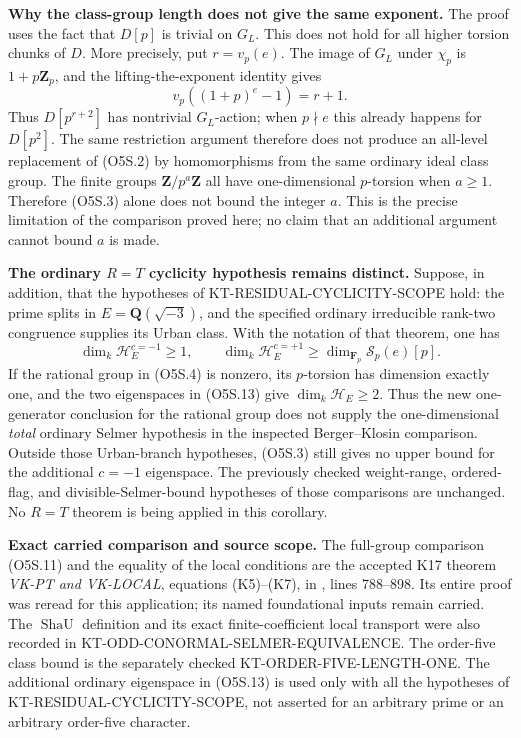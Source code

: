 \documentclass[11pt,a4paper]{article}
\theoremstyle{definition}
\renewcommand{\paragraph}[1]{\par\smallskip\noindent\textbf{#1}\quad\ignorespaces}
\begin{document}
\paragraph{Why the class-group length does not give the same exponent.}
The proof uses the fact that $D[p]$ is trivial on $G_L$.
This does not hold for all higher torsion chunks of $D$.
More precisely, put $r=v_p(e)$.  The image of $G_L$ under
$\chi_p$ is $1+p\mathbf Z_p$, and the lifting-the-exponent
identity gives
\[
                  v_p((1+p)^e-1)=r+1.
 \tag{O5S.12}
\]
Thus $D[p^{r+2}]$ has nontrivial $G_L$-action; when $p\nmid e$
this already happens for $D[p^2]$.
The same restriction argument therefore does not produce an
all-level replacement of (O5S.2) by homomorphisms from the same
ordinary ideal class group.
The finite groups $\mathbf Z/p^a\mathbf Z$ all have
one-dimensional $p$-torsion when $a\ge1$.
Therefore (O5S.3) alone does not bound the integer $a$.
This is the precise limitation of the comparison proved here;
no claim that an additional argument cannot bound $a$ is made.

\paragraph{The ordinary $R=T$ cyclicity hypothesis remains distinct.}
Suppose, in addition, that the hypotheses of
KT-RESIDUAL-CYCLICITY-SCOPE hold: the prime splits in
$E=\mathbf Q(\sqrt{-3})$, and the specified ordinary
irreducible rank-two congruence supplies its Urban class.
With the notation of that theorem, one has
\[
 \dim_k\mathcal H_E^{c=-1}\ge1,
 \qquad
 \dim_k\mathcal H_E^{c=+1}
        \ge\dim_{\mathbf F_p}\mathcal S_p(e)[p].
 \tag{O5S.13}
\]
If the rational group in (O5S.4) is nonzero, its $p$-torsion
has dimension exactly one, and the two eigenspaces in
(O5S.13) give $\dim_k\mathcal H_E\ge2$.
Thus the new one-generator conclusion for the rational
group does not supply the one-dimensional \emph{total}
ordinary Selmer hypothesis in the inspected Berger--Klosin
comparison.  Outside those Urban-branch hypotheses,
(O5S.3) still gives no upper bound for the additional
$c=-1$ eigenspace.  The previously checked weight-range,
ordered-flag, and divisible-Selmer-bound hypotheses of
those comparisons are unchanged.  No $R=T$ theorem is
being applied in this corollary.

\paragraph{Exact carried comparison and source scope.}
The full-group comparison (O5S.11) and the equality of
the local conditions are the accepted K17 theorem
\emph{VK-PT and VK-LOCAL}, equations (K5)--(K7), in
,
lines 788--898.  Its entire proof was reread for this
application; its named foundational inputs remain carried.
The $\operatorname{ShaU}$ definition and its exact
finite-coefficient local transport were also recorded in
KT-ODD-CONORMAL-SELMER-EQUIVALENCE.
The order-five class bound is the separately checked
KT-ORDER-FIVE-LENGTH-ONE.  The additional ordinary
eigenspace in (O5S.13) is used only with all the hypotheses
of KT-RESIDUAL-CYCLICITY-SCOPE, not asserted for an arbitrary
prime or an arbitrary order-five character.
\end{document}
